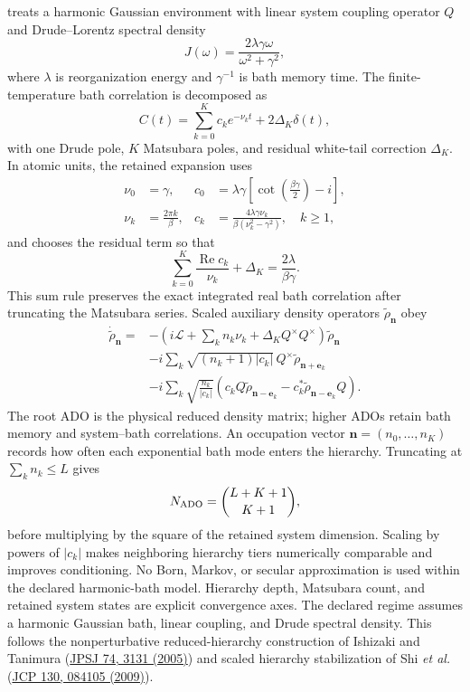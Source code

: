 \documentclass[11pt]{article}
\newcommand{\code}[1]{\texttt{\detokenize{#1}}}
\begin{document}
\code{heom_nonmarkovian.py} treats a harmonic Gaussian environment with linear
system coupling operator $Q$ and Drude--Lorentz spectral density
\begin{equation}
 J(\omega)=\frac{2\lambda\gamma\omega}{\omega^2+\gamma^2},
\end{equation}
where $\lambda$ is reorganization energy and $\gamma^{-1}$ is bath memory time.
The finite-temperature bath correlation is decomposed as
\begin{equation}
 C(t)=\sum_{k=0}^{K}c_k e^{-\nu_k t}+2\Delta_K\delta(t),
\end{equation}
with one Drude pole, $K$ Matsubara poles, and residual white-tail correction
$\Delta_K$. In atomic units, the retained expansion uses
\begin{align}
 \nu_0&=\gamma,&
 c_0&=\lambda\gamma\left[\cot\left(\frac{\beta\gamma}{2}\right)-i\right],\\
 \nu_k&=\frac{2\pi k}{\beta},&
 c_k&=\frac{4\lambda\gamma\nu_k}{\beta(\nu_k^2-\gamma^2)},\quad k\ge 1,
\end{align}
and chooses the residual term so that
\begin{equation}
 \sum_{k=0}^{K}\frac{\operatorname{Re}c_k}{\nu_k}+\Delta_K
 =\frac{2\lambda}{\beta\gamma}.
\end{equation}
This sum rule preserves the exact integrated real bath correlation after truncating
the Matsubara series. Scaled auxiliary density operators
$\tilde\rho_{\boldsymbol n}$ obey
\begin{align}
 \dot{\tilde\rho}_{\boldsymbol n}={}&-
 \left(i\mathcal L+\sum_k n_k\nu_k+\Delta_K Q^\times Q^\times\right)
 \tilde\rho_{\boldsymbol n} \nonumber\\
 &-i\sum_k\sqrt{(n_k+1)|c_k|}\,Q^\times
 \tilde\rho_{\boldsymbol n+\boldsymbol e_k} \nonumber\\
 &-i\sum_k\sqrt{\frac{n_k}{|c_k|}}
 \left(c_k Q\tilde\rho_{\boldsymbol n-\boldsymbol e_k}
 -c_k^*\tilde\rho_{\boldsymbol n-\boldsymbol e_k}Q\right).
\end{align}
The root ADO is the physical reduced density matrix; higher ADOs retain bath
memory and system--bath correlations. An occupation vector
$\boldsymbol n=(n_0,\ldots,n_K)$ records how often each exponential bath mode enters
the hierarchy. Truncating at $\sum_k n_k\le L$ gives
\begin{equation}
 N_{\rm ADO}=\binom{L+K+1}{K+1},
\end{equation}
before multiplying by the square of the retained system dimension. Scaling by
powers of $|c_k|$ makes neighboring hierarchy tiers numerically comparable and
improves conditioning. No Born, Markov, or secular approximation is used within
the declared harmonic-bath model. Hierarchy depth, Matsubara count, and retained
system states are explicit convergence axes. The declared regime assumes a
harmonic Gaussian bath, linear
coupling, and Drude spectral density. This follows
the nonperturbative reduced-hierarchy construction of Ishizaki and Tanimura
(\href{https://doi.org/10.1143/JPSJ.74.3131}{JPSJ 74, 3131 (2005)}) and scaled
hierarchy stabilization of Shi \emph{et al.}
(\href{https://doi.org/10.1063/1.3077918}{JCP 130, 084105 (2009)}).
\end{document}
